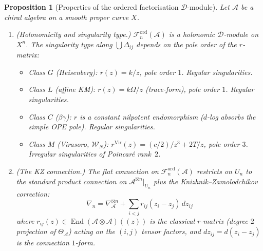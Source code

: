 \documentclass[11pt,reqno]{amsart}
\newtheorem{proposition}[theorem]{Proposition}
\theoremstyle{definition}
\theoremstyle{remark}
\newcommand{\cA}{\mathcal{A}}
\newcommand{\cD}{\mathcal{D}}
\newcommand{\cF}{\mathcal{F}}
\newcommand{\cW}{\mathcal{W}}
\DeclareMathOperator{\End}{End}
\numberwithin{equation}{section}
\begin{document}
\begin{proposition}[Properties of the ordered
factorisation $\cD$-module]
\label{prop:fact-dmod-props}
Let $\cA$ be a chiral algebra on a smooth proper curve $X$.
\begin{enumerate}[label=\textup{(\roman*)}]
\item \textup{(Holonomicity and singularity type.)}
  $\cF_n^{\mathrm{ord}}(\cA)$ is a holonomic
  $\cD$-module on $X^n$.
  The singularity type along $\bigcup \Delta_{ij}$ depends
  on the pole order of the $r$-matrix:
  \begin{itemize}
  \item \textup{Class $G$ \textup{(}Heisenberg\textup{)}:}
    $r(z) = k/z$, pole order $1$. Regular singularities.
  \item \textup{Class $L$ \textup{(}affine KM\textup{)}:}
    $r(z) = k\Omega/z$ \textup{(}trace-form\textup{)},
    pole order $1$. Regular singularities.
  \item \textup{Class $C$ \textup{(}$\beta\gamma$\textup{)}:}
    $r$ is a constant nilpotent endomorphism
    \textup{(}$d$-log absorbs the simple OPE pole\textup{)}.
    Regular singularities.
  \item \textup{Class $M$ \textup{(}Virasoro, $\cW_N$\textup{)}:}
    $r^{\mathrm{Vir}}(z) = (c/2)/z^3 + 2T/z$,
    pole order $3$. \emph{Irregular} singularities
    of Poincar\'e rank~$2$.
  \end{itemize}
\item \textup{(The KZ connection.)}
  The flat connection on $\cF_n^{\mathrm{ord}}(\cA)$
  restricts on $U_n$ to the standard product connection
  on $\cA^{\boxtimes n}|_{U_n}$ plus the
  Knizhnik--Zamolodchikov correction:
  \begin{equation}\label{eq:kz-conn}
    \nabla_n
    = \nabla_{\cA}^{\boxtimes n}
    + \sum_{i < j}
    r_{ij}(z_i - z_j) \, dz_{ij}
  \end{equation}
  where $r_{ij}(z) \in \End(\cA \otimes \cA)((z))$
  is the classical $r$-matrix \textup{(}degree-$2$
  projection of $\Theta_\cA$\textup{)} acting on the
  $(i,j)$ tensor factors, and
  $dz_{ij} = d(z_i - z_j)$ is the connection $1$-form.


\end{enumerate}
\end{proposition}
\end{document}
